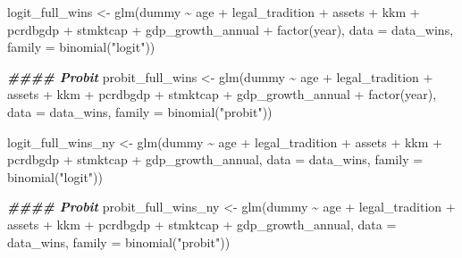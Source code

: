 \documentclass[a4paper,nobind]{templates/ociamthesis}
\newenvironment{Shaded}{\begin{snugshade}}{\end{snugshade}}
\newcommand{\AttributeTok}[1]{\textcolor[rgb]{0.77,0.63,0.00}{#1}}
\newcommand{\DocumentationTok}[1]{\textcolor[rgb]{0.56,0.35,0.01}{\textbf{\textit{#1}}}}
\newcommand{\FunctionTok}[1]{\textcolor[rgb]{0.00,0.00,0.00}{#1}}
\newcommand{\NormalTok}[1]{#1}
\newcommand{\OtherTok}[1]{\textcolor[rgb]{0.56,0.35,0.01}{#1}}
\newcommand{\SpecialCharTok}[1]{\textcolor[rgb]{0.00,0.00,0.00}{#1}}
\newcommand{\StringTok}[1]{\textcolor[rgb]{0.31,0.60,0.02}{#1}}
\renewenvironment{Shaded}
{
  \vspace{10pt}%
  \begin{snugshade}%
}{%
  \end{snugshade}%
  \vspace{8pt}%
}
\begin{document}
\begin{Shaded}
\begin{Highlighting}[]
\NormalTok{logit\_full\_wins }\OtherTok{\textless{}{-}} \FunctionTok{glm}\NormalTok{(dummy }\SpecialCharTok{\textasciitilde{}}\NormalTok{ age }\SpecialCharTok{+}\NormalTok{ legal\_tradition }\SpecialCharTok{+} 
\NormalTok{       assets }\SpecialCharTok{+}\NormalTok{ kkm }\SpecialCharTok{+} 
\NormalTok{       pcrdbgdp }\SpecialCharTok{+}\NormalTok{ stmktcap }\SpecialCharTok{+}\NormalTok{ gdp\_growth\_annual }\SpecialCharTok{+} 
       \FunctionTok{factor}\NormalTok{(year), }\AttributeTok{data =}\NormalTok{ data\_wins, }
       \AttributeTok{family =} \FunctionTok{binomial}\NormalTok{(}\StringTok{"logit"}\NormalTok{))}

\DocumentationTok{\#\#\#\# Probit}
\NormalTok{probit\_full\_wins }\OtherTok{\textless{}{-}} \FunctionTok{glm}\NormalTok{(dummy }\SpecialCharTok{\textasciitilde{}}\NormalTok{ age }\SpecialCharTok{+}\NormalTok{ legal\_tradition }\SpecialCharTok{+} 
\NormalTok{       assets }\SpecialCharTok{+}\NormalTok{ kkm }\SpecialCharTok{+} 
\NormalTok{       pcrdbgdp }\SpecialCharTok{+}\NormalTok{ stmktcap }\SpecialCharTok{+}\NormalTok{ gdp\_growth\_annual }\SpecialCharTok{+} 
       \FunctionTok{factor}\NormalTok{(year), }\AttributeTok{data =}\NormalTok{ data\_wins,}
       \AttributeTok{family =} \FunctionTok{binomial}\NormalTok{(}\StringTok{"probit"}\NormalTok{))}

\NormalTok{logit\_full\_wins\_ny }\OtherTok{\textless{}{-}} \FunctionTok{glm}\NormalTok{(dummy }\SpecialCharTok{\textasciitilde{}}\NormalTok{ age }\SpecialCharTok{+}\NormalTok{ legal\_tradition }\SpecialCharTok{+} 
\NormalTok{       assets }\SpecialCharTok{+}\NormalTok{ kkm }\SpecialCharTok{+} 
\NormalTok{       pcrdbgdp }\SpecialCharTok{+}\NormalTok{ stmktcap }\SpecialCharTok{+}\NormalTok{ gdp\_growth\_annual, }
       \AttributeTok{data =}\NormalTok{ data\_wins, }
       \AttributeTok{family =} \FunctionTok{binomial}\NormalTok{(}\StringTok{"logit"}\NormalTok{))}

\DocumentationTok{\#\#\#\# Probit}
\NormalTok{probit\_full\_wins\_ny }\OtherTok{\textless{}{-}} \FunctionTok{glm}\NormalTok{(dummy }\SpecialCharTok{\textasciitilde{}}\NormalTok{ age }\SpecialCharTok{+}\NormalTok{ legal\_tradition }\SpecialCharTok{+} 
\NormalTok{       assets }\SpecialCharTok{+}\NormalTok{ kkm }\SpecialCharTok{+} 
\NormalTok{       pcrdbgdp }\SpecialCharTok{+}\NormalTok{ stmktcap }\SpecialCharTok{+}\NormalTok{ gdp\_growth\_annual, }
       \AttributeTok{data =}\NormalTok{ data\_wins,}
       \AttributeTok{family =} \FunctionTok{binomial}\NormalTok{(}\StringTok{"probit"}\NormalTok{))}
\end{Highlighting}
\end{Shaded}
\end{document}
